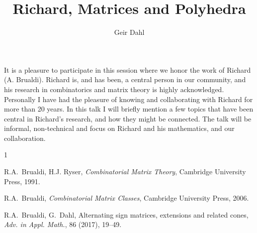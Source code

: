 \documentclass[a4paper]{amsart}
\date{}
\begin{document}
\title{Richard, Matrices and Polyhedra}
\author{Geir Dahl} %
\address{University of Oslo} %

\maketitle


It is a pleasure to participate in this session where we honor  the work of Richard (A. Brualdi). Richard is, and has been, a central person in our community, and his research in combinatorics and matrix theory is highly acknowledged. 
Personally I have had the pleasure of knowing and collaborating with Richard for more than 20 years. In this talk I will briefly mention a few topics that have been central in Richard's research, and how they might be connected. The talk will be informal, non-technical and focus on Richard and his mathematics, and our collaboration.




\begin{thebibliography}{1}

  R.A.~Brualdi, H.J. Ryser, {\it Combinatorial Matrix Theory}, Cambridge University Press, 1991.

  R.A.~Brualdi, {\it Combinatorial Matrix Classes}, Cambridge University Press, 2006.


  R.A.~Brualdi,  G.~Dahl, Alternating sign matrices, extensions and related cones, {\it Adv. in  Appl. Math.}, 86 (2017), 19--49.
 
 
\end{thebibliography}
\end{document}
